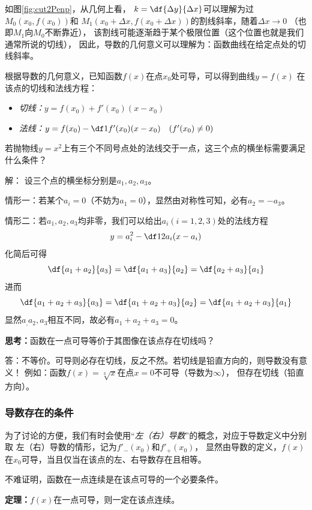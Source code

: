 如图\ref{fig:cut2Penp}，从几何上看，
$k=\df{\Delta y}{\Delta x}$可以理解为过$M_0(x_0,f(x_0))$和
$M_1(x_0+\Delta x,f(x_0+\Delta x))$的割线斜率，随着$\Delta x\to0$
（也即$M_1$向$M_0$不断靠近），
该割线可能逐渐趋于某个极限位置（这个位置也就是我们通常所说的{\kaishu 切线}），
因此，导数的几何意义可以理解为：函数曲线在给定点处的切线斜率。

根据导数的几何意义，已知函数$f(x)$在点$x_0$处可导，可以得到曲线$y=f(x)$
在该点的切线和法线方程：
\begin{thx}
	\begin{itemize}
	  \item {\it 切线：\quad $y=f(x_0)+f'(x_0)(x-x_0)$}
	  \item {\it 法线：\quad $y=f(x_0)-\df1{f'(x_0)}(x-x_0)\quad(f'(x_0)\ne 0)$}
	\end{itemize}
\end{thx}

\egz 若抛物线$y=x^2$上有三个不同号点处的法线交于一点，这三个点的横坐标需要满足什么条件？

解： 设三个点的横坐标分别是$a_1,a_2,a_3$。

情形一：若某个$a_i=0$（不妨为$a_1=0$），显然由对称性可知，必有$a_2=-a_3$。

情形二：若$a_1,a_2,a_3$均非零，我们可以给出$a_i(i=1,2,3)$处的法线方程
$$y=a_i^2-\df1{2a_i}(x-a_i)$$
化简后可得
$$\df{a_1+a_2}{a_3}=\df{a_1+a_3}{a_2}=\df{a_2+a_3}{a_1}$$
进而
$$\df{a_1+a_2+a_3}{a_3}=\df{a_1+a_2+a_3}{a_2}=\df{a_1+a_2+a_3}{a_1}$$
显然$a_,a_2,a_3$相互不同，故必有$a_1+a_2+a_3=0$。
\fin

\bs
{\bf 思考：}函数在一点可导等价于其图像在该点存在切线吗？

\ifhint
答：不等价。可导则必存在切线，反之不然。若切线是铅直方向的，则导数没有意义！
例如：函数$f(x)=\sqrt[3]x$在点$x=0$不可导（导数为$\infty$），
但存在切线（铅直方向）。
\fi

\subsubsection{导数存在的条件}

为了讨论的方便，我们有时会使用“{\it 左（右）导数}”的概念，对应于导数定义中分别取
左（右）导数的情形，记为{$f'_-(x_0)$}和{$f'_+(x_0)$}，
显然由导数的定义，$f(x)$在$x_0$可导，当且仅当在该点的左、右导数存在且相等。

不难证明，函数在一点连续是在该点可导的一个必要条件。

\begin{thx}
	{\bf 定理：}$f(x)$在一点可导，则一定在该点连续。
\end{thx}

